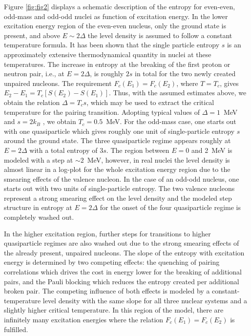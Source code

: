 \begin{multicols}{2}
Figure \ref{fig:fig2} displays a schematic description of the entropy for 
even-even, odd-mass and odd-odd nuclei as function of excitation energy. In the
lower excitation energy region of the even-even nucleus, only the ground state 
is present, and above $E\sim 2\Delta$ the level density is assumed to follow a 
constant temperature formula. It has been shown \cite{GB00,GH01} that the 
single particle entropy $s$ is an approximately extensive thermodynamical 
quantity in nuclei at these temperatures. The increase in entropy at the 
breaking of the first proton or neutron pair, i.e., at $E=2\Delta$, is roughly
$2s$ in total for the two newly created unpaired nucleons. The requirement 
$F_c(E_1)=F_c(E_2)$, where $T=T_c$, gives 
$E_2-E_1=T_c\left[S(E_2)-S(E_1)\right]$. Thus, with the assumed estimates 
above, we obtain the relation $\Delta=T_cs$, which may be used to extract the 
critical temperature for the pairing transition. Adopting typical values of 
$\Delta=1$~MeV and $s=2k_B$ \cite{GB00,GH01}, we obtain $T_c=0.5$~MeV\@. For 
the odd-mass case, one starts out with one quasiparticle which gives roughly 
one unit of single-particle entropy $s$ around the ground state. The three 
quasiparticle regime appears roughly at $E=2\Delta$ with a total entropy of 
$3s$. The region between $E=0$ and 2~MeV is modeled with a step at 
$\sim 2$~MeV, however, in real nuclei the level density is almost linear in a 
log-plot for the whole excitation energy region due to the smearing effects of 
the valence nucleon. In the case of an odd-odd nucleus, one starts out with two
units of single-particle entropy. The two valence nucleons represent a strong 
smearing effect on the level density and the modeled step structure in entropy 
at $E=2\Delta$ for the onset of the four quasiparticle regime is completely 
washed out.

In the higher excitation region, further steps for transitions to higher 
quasiparticle regimes are also washed out due to the strong smearing effects of
the already present, unpaired nucleons. The slope of the entropy with 
excitation energy is determined by two competing effects: the quenching of 
pairing correlations which drives the cost in energy lower for the breaking of 
additional pairs, and the Pauli blocking which reduces the entropy created per 
additional broken pair. The competing influence of both effects is modeled by a
constant-temperature level density with the same slope for all three nuclear 
systems and a slightly higher critical temperature. In this region of the 
model, there are infinitely many excitation energies where the relation 
$F_c(E_1)=F_c(E_2)$ is fulfilled.


\end{multicols}
